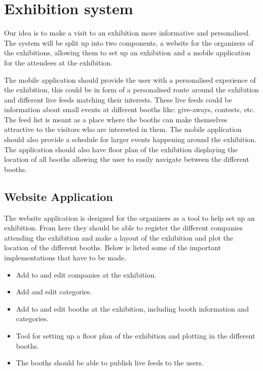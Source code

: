 \section{Exhibition system}\label{sec:exhibsystem}

Our idea is to make a visit to an exhibition more informative and personalised. The system will be split up into two components, a website for the organizers of the exhibitions, allowing them to set up an exhibition and a mobile application for the attendees at the exhibition.

The mobile application should provide the user with a personalised experience of the exhibition, this could be in form of a personalised route around the exhibition and different live feeds matching their interests. These live feeds could be information about small events at different booths like: give-aways, contests, etc. The feed list is meant as a place where the booths can make themselves attractive to the visitors who are interested in them. The mobile application should also provide a schedule for larger events happening around the exhibition. The application should also have floor plan of the exhibition displaying the location of all booths allowing the user to easily navigate between the different booths. 

\subsection*{Website Application}
The website application is designed for the organizers as a tool to help set up an exhibition. From here they should be able to register the different companies attending the exhibition and make a layout of the exhibition and plot the location of the different booths. Below is listed some of the important implementations that have to be made.
\begin{itemize}
\item Add to and edit companies at the exhibition.
\item Add and edit categories.
\item Add to and edit booths at the exhibition, including booth information and categories.
\item Tool for setting up a floor plan of the exhibition and plotting in the different booths.
\item The booths should be able to publish live feeds to the users.
\end{itemize}
